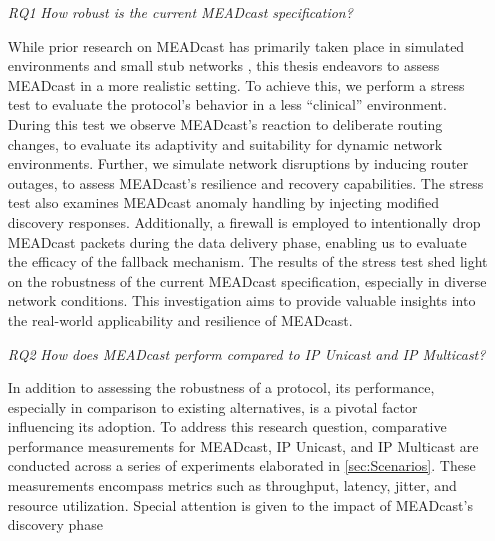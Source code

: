 \begin{enumerate}
    \item[\textit{RQ1}]\label{rq1}
        \textit{How robust is the current MEADcast specification?}\par
        While prior research on MEADcast has primarily taken place in simulated
            environments \cite{meadcast1, meadcast2} and small stub networks
            \cite{sdn_ba}, this thesis endeavors to assess MEADcast in a more
            realistic setting.
        To achieve this, we perform a stress test to evaluate the protocol's
            behavior in a less ``clinical'' environment.
        During this test we observe MEADcast's reaction to deliberate routing
            changes, to evaluate its adaptivity and suitability for dynamic
            network environments.
        Further, we simulate network disruptions by inducing router outages, to
            assess MEADcast's resilience and recovery capabilities.
        The stress test also examines MEADcast anomaly handling by injecting
            modified discovery responses.
        Additionally, a firewall is employed to intentionally drop MEADcast
            packets during the data delivery phase, enabling us to evaluate the
            efficacy of the fallback mechanism.
        The results of the stress test shed light on the robustness of the
            current MEADcast specification, especially in diverse network
            conditions.
        This investigation aims to provide valuable insights into the
            real-world applicability and resilience of MEADcast.
        \item[\textit{RQ2}]\label{rq2}
        \textit{How does MEADcast perform compared to IP Unicast and
        IP Multicast?}\par
        In addition to assessing the robustness of a protocol, its performance,
            especially in comparison to existing alternatives, is a pivotal
            factor influencing its adoption.
        To address this research question, comparative performance measurements
            for MEADcast, IP Unicast, and IP Multicast are conducted across a
            series of experiments elaborated in \autoref{sec:Scenarios}.
        These measurements encompass metrics such as throughput, latency,
            jitter, and resource utilization.
        Special attention is given to the impact of MEADcast's discovery phase

\end{enumerate}
